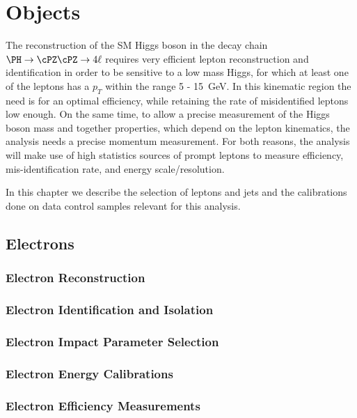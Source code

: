 \section{Objects}
\label{sec:objects}

The reconstruction of the SM Higgs boson in the decay chain $\HZZfl$ requires very efficient lepton reconstruction and identification in order to be sensitive
to a low mass Higgs, for which at least one of the leptons has a $p_T$ within the range 5 - 15~GeV. In this kinematic region the need is for an optimal
efficiency, while retaining the rate of misidentified leptons low enough. On the same time, to allow a precise measurement of the Higgs boson mass and together
properties, which depend on the lepton kinematics, the analysis needs a precise momentum measurement. For both reasons, the analysis will make use of high
statistics sources of prompt leptons to measure efficiency, mis-identification rate, and energy scale/resolution.

In this chapter we describe the selection of leptons and jets and the calibrations done on data control samples relevant for this analysis.

\subsection{Electrons}

\subsubsection{Electron Reconstruction}
\label{sec:eleReco}


\subsubsection{Electron Identification and Isolation}
\label{sec:ele_MVA}


\subsubsection{Electron Impact Parameter Selection}
\label{sec:eleSIP}


\subsubsection{Electron Energy Calibrations}


\subsubsection{Electron Efficiency Measurements}
\label{sec:eleEffMeas}


